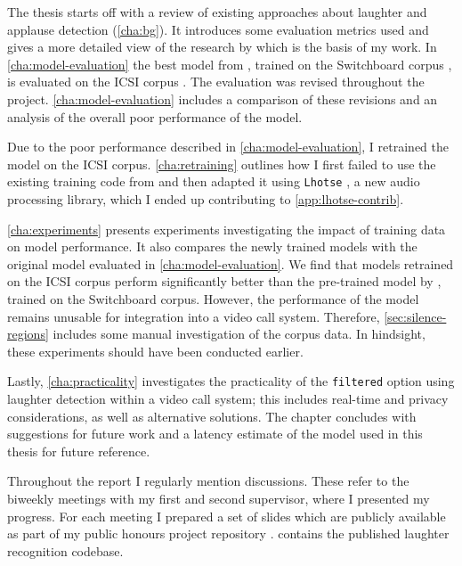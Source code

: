 \documentclass[bsc,frontabs,parskip,deptreport]{infthesis}
\begin{document}
The thesis starts off with a review of existing approaches about laughter and applause detection (\autoref{cha:bg}). It introduces some evaluation metrics used and gives a more detailed view of the research by \citet{gillick2021robust} which is the basis of my work. In \autoref{cha:model-evaluation} the best model from \citet{gillick2021robust}, trained on the Switchboard corpus \citep{switchboard-corpus}, is evaluated on the ICSI corpus \citep{morgan2001meeting}. The evaluation was revised throughout the project. \autoref{cha:model-evaluation} includes a comparison of these revisions and an analysis of the overall poor performance of the model.

Due to the poor performance described in \autoref{cha:model-evaluation}, I retrained the model on the ICSI corpus. \autoref{cha:retraining} outlines how I first failed to use the existing training code from \citet{gillick2021robust} and then adapted it using \texttt{Lhotse} \citep{zelasko2021lhotse}, a new audio processing library, which I ended up contributing to \autoref{app:lhotse-contrib}.

\autoref{cha:experiments} presents experiments investigating the impact of training data on model performance. It also compares the newly trained models with the original model evaluated in \autoref{cha:model-evaluation}. We find that models retrained on the ICSI corpus perform significantly better than the pre-trained model by \citet{gillick2021robust}, trained on the Switchboard corpus. However, the performance of the model remains unusable for integration into a video call system. Therefore, \autoref{sec:silence-regions} includes some manual investigation of the corpus data. In hindsight, these experiments should have been conducted earlier. 

Lastly, \autoref{cha:practicality} investigates the practicality of the \texttt{filtered} option using laughter detection within a video call system; this includes real-time and privacy considerations, as well as alternative solutions. The chapter concludes with suggestions for future work and a latency estimate of the model used in this thesis for future reference. 

Throughout the report I regularly mention discussions. These refer to the biweekly meetings with my first and second supervisor, where I presented my progress. For each meeting I prepared a set of slides which are publicly available as part of my public honours project repository \citep{Wolter_Honours_Project_2021_22_2022}.
\citet{Wolter_A_Machine_Learning_2022} contains the published laughter recognition codebase. 
\end{document}
